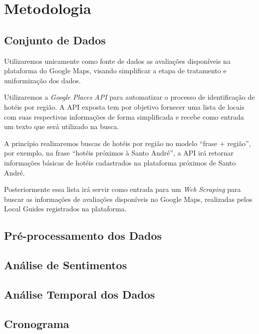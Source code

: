\chapter{Metodologia}
\label{cap:metodologia}

\section{Conjunto de Dados}

Utilizaremos unicamente como fonte de dados as avaliações disponíveis na plataforma do Google Maps, visando simplificar a etapa de tratamento e uniformização dos dados.

Utilizaremos a \emph{Google Places API} para automatizar o processo de identificação de hotéis por região. A API exposta tem por objetivo fornecer uma lista de locais com suas respectivas informações de forma simplificada e recebe como entrada um texto que será utilizado na busca.

A princípio realizaremos buscas de hotéis por região no modelo “frase + região”, por exemplo, na frase “hotéis próximos à Santo André”, a API irá retornar informações básicas de hotéis cadastrados na plataforma próximos de Santo André.

Posteriormente essa lista irá servir como entrada para um \emph{Web Scraping} para buscar as informações de avaliações disponíveis no Google Maps, realizadas pelos Local Guides\cite{google2022localguides} registrados na plataforma.

\section{Pré-processamento dos Dados}



\section{Análise de Sentimentos}



\section{Análise Temporal dos Dados}



\section{Cronograma}
